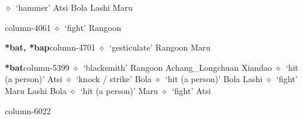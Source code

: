 \hspace{1ex}
         $\diamond$~`hammer'
         Atsi 
\hspace{1ex}
         Bola 
\hspace{1ex}
         Lashi 
\hspace{1ex}
         Maru 
  \item {\footnotesize \textbf{}}{\tiny column-4061}
         $\diamond$~`fight'
         Rangoon 
  \item {\footnotesize \textbf{*bat, *bap}}{\tiny column-4701}
         $\diamond$~`gesticulate'
         Rangoon 
\hspace{1ex}
         Maru 
  \item {\footnotesize \textbf{*bat}}{\tiny column-5399}
         $\diamond$~`blacksmith'
         Rangoon 
\hspace{1ex}
         Achang\_Longchuan 
\hspace{1ex}
         Xiandao 
\hspace{1ex}
         $\diamond$~`hit (a person)'
         Atsi 
\hspace{1ex}
         $\diamond$~`knock / strike'
         Bola 
\hspace{1ex}
         $\diamond$~`hit (a person)'
         Bola 
\hspace{1ex}
         Lashi 
\hspace{1ex}
         $\diamond$~`fight'
         Maru 
\hspace{1ex}
         Lashi 
\hspace{1ex}
         Bola 
\hspace{1ex}
         $\diamond$~`hit (a person)'
         Maru 
\hspace{1ex}
         $\diamond$~`fight'
         Atsi 
  \item {\footnotesize \textbf{}}{\tiny column-6022}
